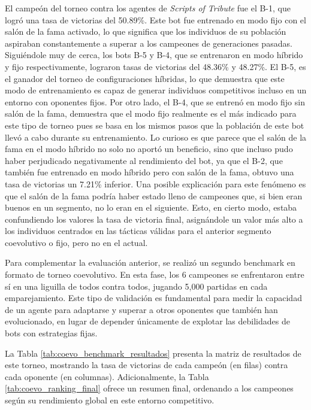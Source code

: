 El campeón del torneo contra los agentes de \textit{Scripts of Tribute} fue el B-1, que logró una tasa de victorias del 50.89\%. Este bot fue entrenado en modo fijo con el salón de la fama activado, lo que significa que los individuos de su población aspiraban constantemente a superar a los campeones de generaciones pasadas. Siguiéndole muy de cerca, los bots B-5 y B-4, que se entrenaron en modo híbrido y fijo respectivamente, lograron tasas de victorias del 48.36\% y 48.27\%. El B-5, es el ganador del torneo de configuraciones híbridas, lo que demuestra que este modo de entrenamiento es capaz de generar individuos competitivos incluso en un entorno con oponentes fijos. Por otro lado, el B-4, que se entrenó en modo fijo sin salón de la fama, demuestra que el modo fijo realmente es el más indicado para este tipo de torneo pues se basa en los mismos pasos que la población de este bot llevó a cabo durante su entrenamiento. Lo curioso es que parece que el salón de la fama en el modo híbrido no solo no aportó un beneficio, sino que incluso pudo haber perjudicado negativamente al rendimiento del bot, ya que el B-2, que también fue entrenado en modo híbrido pero con salón de la fama, obtuvo una tasa de victorias un 7.21\% inferior. Una posible explicación para este fenómeno es que el salón de la fama podría haber estado lleno de campeones que, si bien eran buenos en un segmento, no lo eran en el siguiente. Esto, en cierto modo, estaba confundiendo los valores la tasa de victoria final, asignándole un valor más alto a los individuos centrados en las tácticas válidas para el anterior segmento coevolutivo o fijo, pero no en el actual.



Para complementar la evaluación anterior, se realizó un segundo benchmark en formato de torneo coevolutivo. En esta fase, los 6 campeones se enfrentaron entre sí en una liguilla de todos contra todos, jugando 5,000 partidas en cada emparejamiento. Este tipo de validación es fundamental para medir la capacidad de un agente para adaptarse y superar a otros oponentes que también han evolucionado, en lugar de depender únicamente de explotar las debilidades de bots con estrategias fijas.

La Tabla \ref{tab:coevo_benchmark_resultados} presenta la matriz de resultados de este torneo, mostrando la tasa de victorias de cada campeón (en filas) contra cada oponente (en columnas). Adicionalmente, la Tabla \ref{tab:coevo_ranking_final} ofrece un resumen final, ordenando a los campeones según su rendimiento global en este entorno competitivo.

